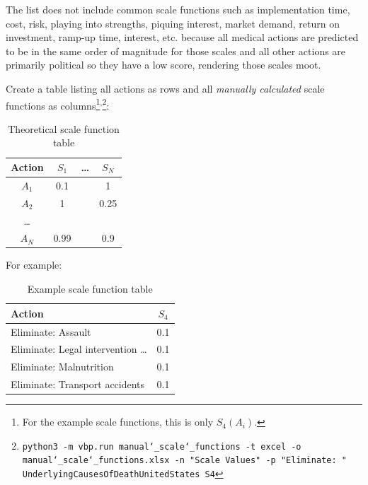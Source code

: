 \documentclass[12pt, a4paper, twocolumn]{article}
\begin{document}
The list does not include common scale functions such as implementation time, cost, risk, playing into strengths, piquing interest, market demand, return on investment, ramp-up time, interest, etc. because all medical actions are predicted to be in the same order of magnitude for those scales and all other actions are primarily political so they have a low score, rendering those scales moot.

Create a table listing all actions as rows and all \textit{manually calculated} scale functions as columns\footnote{For the example scale functions, this is only $S_4(A_i)$.}\textsuperscript{,}\footnote{\texttt{python3 -m vbp.run manual\char`_scale\char`_functions -t excel -o manual\char`_scale\char`_functions.xlsx -n "Scale Values" -p "Eliminate: " UnderlyingCausesOfDeathUnitedStates S4}}:

\begin{table}[H]
  \centering
  \begin{tabular}{cccc}
    \toprule
      Action & $S_1$  & \ldots & $S_N$  \\
    \midrule
      $A_1$  & 0.1    &        & 1      \\
      $A_2$  & 1      &        & 0.25   \\
      \ldots &        &        &        \\
      $A_N$  & 0.99   &        & 0.9    \\
    \bottomrule
  \end{tabular}
  \caption{Theoretical scale function table}
  \label{table:scaletable}
\end{table}

For example:

\begin{table}[H]
  \centering
  \begin{tabular}{lc}
    \toprule
      Action                               & $S_4$ \\
    \midrule
      Eliminate: Assault                   & 0.1   \\
      Eliminate: Legal intervention \ldots & 0.1   \\
      Eliminate: Malnutrition              & 0.1   \\
      Eliminate: Transport accidents       & 0.1   \\
    \bottomrule
  \end{tabular}
  \caption{Example scale function table}
  \label{table:exscaletable}
\end{table}
\end{document}
